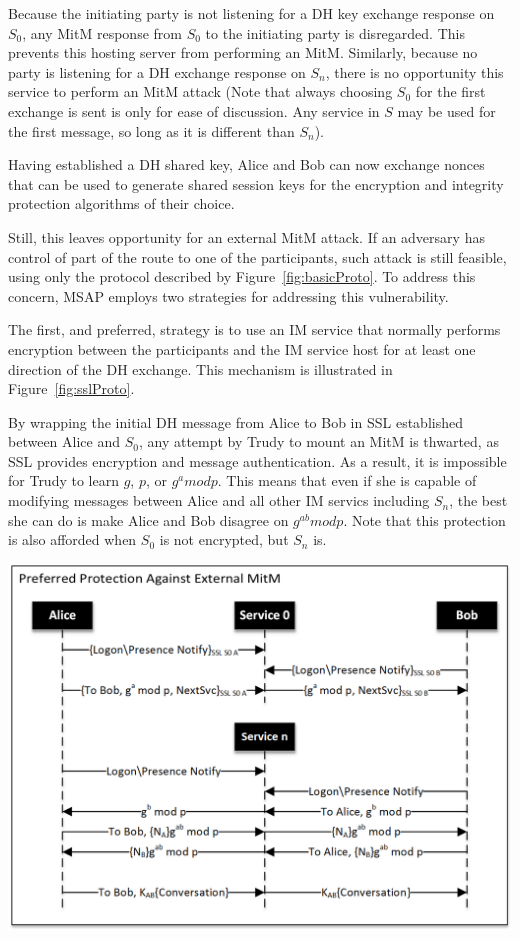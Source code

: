 \documentclass[twoside,10pt]{article}
\newenvironment{Figure}
  {\par\medskip\noindent\minipage{\linewidth}}
  {\endminipage\par\medskip}
\begin{document}
\begin{multicols}{2}
Because the initiating party is not listening for a DH key exchange response on $S_0$, any MitM response from $S_0$ to the initiating party is disregarded.  This prevents this hosting server from performing an MitM.  Similarly, because no party is listening for a DH exchange response on $S_n$, there is no opportunity this service to perform an MitM attack (Note that always choosing $S_0$ for the first exchange is sent is only for ease of discussion.  Any service in $S$ may be used for the first message, so long as it is different than $S_n$).

Having established a DH shared key, Alice and Bob can now exchange nonces that can be used to generate shared session keys for the encryption and integrity protection algorithms of their choice.

Still, this leaves opportunity for an external MitM attack.  If an adversary has control of part of the route to one of the participants, such attack is still feasible, using only the protocol described by Figure~\ref{fig:basicProto}.  To address this concern, MSAP employs two strategies for addressing this vulnerability.

The first, and preferred, strategy is to use an IM service that normally performs encryption between the participants and the IM service host for at least one direction of the DH exchange.  This mechanism is illustrated in Figure~\ref{fig:sslProto}.

By wrapping the initial DH message from Alice to Bob in SSL established between Alice and $S_0$, any attempt by Trudy to mount an MitM is thwarted, as SSL provides encryption and message authentication.  As a result, it is impossible for Trudy to learn $g$, $p$, or $g^a mod p$.  This means that even if she is capable of modifying messages between Alice and all other IM servics including $S_n$, the best she can do is make Alice and Bob disagree on $g^{ab} mod p$.  Note that this protection is also afforded when $S_0$ is not encrypted, but $S_n$ is.

\begin{Figure}
  \centering
  \includegraphics[width=\textwidth]{SSLOnlyDiagramBW.png}
  \label{fig:sslProto}
\end{Figure}


\end{multicols}
\end{document}
